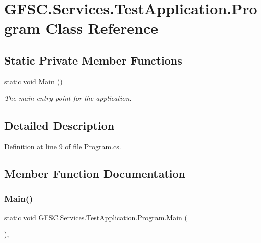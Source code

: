 \hypertarget{class_g_f_s_c_1_1_services_1_1_test_application_1_1_program}{}\section{G\+F\+S\+C.\+Services.\+Test\+Application.\+Program Class Reference}
\label{class_g_f_s_c_1_1_services_1_1_test_application_1_1_program}
\subsection*{Static Private Member Functions}
\begin{DoxyCompactItemize}
\item 
static void \mbox{\hyperlink{class_g_f_s_c_1_1_services_1_1_test_application_1_1_program_ada7d84aac552ecc993fbbdb7fcd10904}{Main}} ()
\begin{DoxyCompactList}\small\item\em The main entry point for the application. \end{DoxyCompactList}\end{DoxyCompactItemize}


\subsection{Detailed Description}


Definition at line 9 of file Program.\+cs.



\subsection{Member Function Documentation}
\mbox{\label{class_g_f_s_c_1_1_services_1_1_test_application_1_1_program_ada7d84aac552ecc993fbbdb7fcd10904}} 
\subsubsection{\texorpdfstring{Main()}{Main()}}
{\footnotesize\ttfamily static void G\+F\+S\+C.\+Services.\+Test\+Application.\+Program.\+Main (\begin{DoxyParamCaption}{ }\end{DoxyParamCaption})\hspace{0.3cm}{\ttfamily [static]}, {\ttfamily [private]}}



